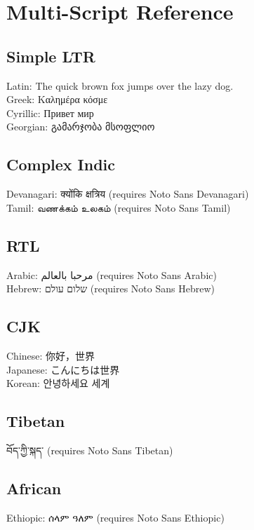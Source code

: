 \documentclass{article}
\begin{document}
\section*{Multi-Script Reference}

\subsection*{Simple LTR}
Latin: The quick brown fox jumps over the lazy dog.\\
Greek: Καλημέρα κόσμε\\
Cyrillic: Привет мир\\
Georgian: გამარჯობა მსოფლიო\\

\subsection*{Complex Indic}
Devanagari: क्योंकि क्षत्रिय (requires Noto Sans Devanagari)\\
Tamil: வணக்கம் உலகம் (requires Noto Sans Tamil)\\

\subsection*{RTL}
Arabic: مرحبا بالعالم (requires Noto Sans Arabic)\\
Hebrew: שלום עולם (requires Noto Sans Hebrew)\\

\subsection*{CJK}
Chinese: {\cjkfont 你好，世界}\\
Japanese: {\cjkfont こんにちは世界}\\
Korean: {\cjkfont 안녕하세요 세계}\\

\subsection*{Tibetan}
བོད་ཀྱི་སྐད་ (requires Noto Sans Tibetan)

\subsection*{African}
Ethiopic: ሰላም ዓለም (requires Noto Sans Ethiopic)
\end{document}
